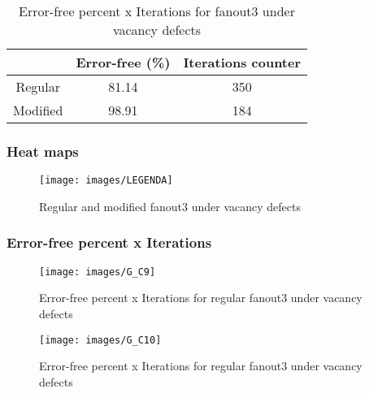 \begin{table}[h]
\begin{center}
\begin{tabular}{|c|c|c|}
\hline
 & Error-free (\%) & Iterations counter \\
\hline
 Regular & 81.14 & 350 \\
\hline
 Modified & 98.91 & 184 \\
\hline

\end{tabular}
\caption{Error-free percent x Iterations for fanout3 under vacancy defects}
\end{center}
\end{table}

\pagebreak
\subsubsection{Heat maps}

\begin{figure}[h]
\center
{}
\hfill
{}
\linebreak
{\texttt{[image: images/LEGENDA]}
}
\caption{Regular and modified fanout3 under vacancy defects}
\label{figure:fanout3_t5}
\end{figure}

\subsubsection{Error-free percent x Iterations}

\begin{figure}[h!]
\center
\texttt{[image: images/G\_C9]}
\caption{Error-free percent x Iterations for regular fanout3 under vacancy defects}
\label{figure:fanout3_reg_gt5}
\end{figure}

\begin{figure}[h!]
\center
\texttt{[image: images/G\_C10]}
\caption{Error-free percent x Iterations for regular fanout3 under vacancy defects}
\label{figure:fanout3_mod_gt5}
\end{figure}
\pagebreak